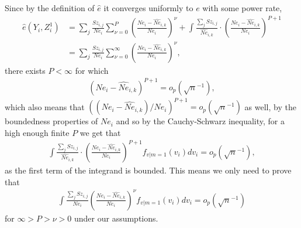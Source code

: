 \documentclass{article}
\theoremstyle{definition}
\theoremstyle{remark}
\begin{document}
Since by the definition of $\hat{e}$ it converges uniformly to $e$ with some power rate, 
\begin{align}
\hat{e}(Y_i, Z_i^1) &= \sum_j \frac{Sz_{i,j}}{Ne_{i}}\sum_{\nu=0}^P\left(\frac{Ne_{i}-\hat{Ne}_{i,k}}{Ne_{i}}\right)^\nu + \int \frac{\sum_j Sz_{i,j}}{\widehat{Ne}_{i,k}} \cdot \left(\frac{Ne_{i}-\widehat{Ne}_{i,k}}{Ne_{i}}\right)^{P+1}\\
&= \sum_j \frac{Sz_{i,j}}{Ne_{i}}\sum_{\nu=0}^\infty\left(\frac{Ne_{i}-\hat{Ne}_{i,k}}{Ne_{i}}\right)^\nu,
\end{align}
there exists $P<\infty$ for which
\begin{align}
(Ne_{i}-\hat{Ne}_{i,k})^{P+1} = o_p\left(\sqrt{n}^{-1}\right),
\end{align} 
which also means that $((Ne_{i}-\hat{Ne}_{i,k})/Ne_i)^{P+1}= o_p\left(\sqrt{n}^{-1}\right)$ as well, by the boundedness properties of $Ne_i$ and so by the Cauchy-Schwarz inequality, for a high enough finite $P$ we get that
\begin{align}
\int \frac{\sum_j Sz_{i,j}}{\widehat{Ne}_{i,k}} \cdot \left(\frac{Ne_{i}-\widehat{Ne}_{i,k}}{Ne_{i}}\right)^{P+1} f_{v|m=1}(v_i) dv_i= o_p\left(\sqrt{n}^{-1}\right),
\end{align}
as the first term of the integrand is bounded. This means we only need to prove that
\begin{align}
\int \frac{\sum_j Sz_{i,j}}{Ne_i} \left(\frac{Ne_{i}-\hat{Ne}_{i,k}}{Ne_{i}}\right)^\nu f_{v|m=1}(v_i) dv_i = o_p\left(\sqrt{n}^{-1}\right)
\end{align}
for $\infty > P > \nu >0$ under our assumptions.
\end{document}
